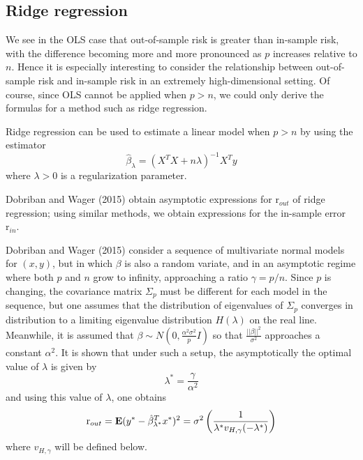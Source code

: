 \documentclass[11pt]{article}
\begin{document}
\subsection{Ridge regression}

We see in the OLS case that out-of-sample risk is greater than
in-sample risk, with the difference becoming more and more pronounced
as $p$ increases relative to $n$.  Hence it is especially interesting
to consider the relationship between out-of-sample risk and in-sample
risk in an extremely high-dimensional setting.  Of course, since OLS
cannot be applied when $p > n$, we could only derive the formulas for
a method such as ridge regression.

Ridge regression can be used to estimate a linear model when $p > n$
by using the estimator
\[
\hat{\beta}_\lambda = (X^T X + n\lambda)^{-1} X^T y
\]
where $\lambda > 0$ is a regularization parameter.

Dobriban and Wager (2015) obtain asymptotic expressions for
$\text{r}_{out}$ of ridge regression; using similar methods, we obtain expressions for the in-sample error $\text{r}_{in}$.

Dobriban and Wager (2015) consider a sequence of multivariate normal
models for $(x,y)$, but in which $\beta$ is also a random variate, and
in an asymptotic regime where both $p$ and $n$ grow to infinity,
approaching a ratio $\gamma = p/n$.  Since $p$ is changing, the
covariance matrix $\Sigma_p$ must be different for each model in the
sequence, but one assumes that the distribution of eigenvalues of
$\Sigma_p$ converges in distribution to a limiting eigenvalue
distribution $H(\lambda)$ on the real line.  Meanwhile, it is assumed
that $\beta \sim N(0, \frac{\alpha^2\sigma^2}{p} I)$ so that $\frac{||\beta||^2}{\sigma^2}$ approaches a constant $\alpha^2$.  It is
shown that under such a setup, the asymptotically
the optimal value of $\lambda$ is given by
\[
\lambda^* = \frac{\gamma}{\alpha^2}
\]
and using this value of $\lambda$, one obtains
\[
\text{r}_{out} = \textbf{E}(y^* - \hat{\beta}_{\lambda^*}^T x^*)^2 =  \sigma^2\left(\frac{1}{\lambda^* v_{H, \gamma}(-\lambda^*)}\right)
\]
where $v_{H,\gamma}$ will be defined below.
\end{document}
